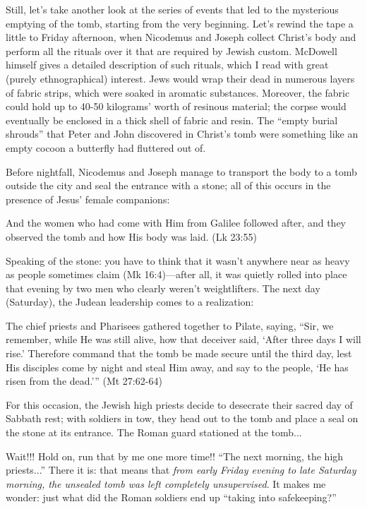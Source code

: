 Still, let's take another look at the series of events that led to the mysterious emptying of the tomb, starting from the very beginning. Let's rewind the tape a little to Friday afternoon, when Nicodemus and Joseph collect Christ's body and perform all the rituals over it that are required by Jewish custom. McDowell himself gives a detailed description of such rituals, which I read with great (purely ethnographical) interest. Jews would wrap their dead in numerous layers of fabric strips, which were soaked in aromatic substances. Moreover, the fabric could hold up to 40-50 kilograms' worth of resinous material; the corpse would eventually be enclosed in a thick shell of fabric and resin. The ``empty burial shrouds'' that Peter and John discovered in Christ's tomb were something like an empty cocoon a butterfly had fluttered out of.

Before nightfall, Nicodemus and Joseph manage to transport the body to a tomb outside the city and seal the entrance with a stone; all of this occurs in the presence of Jesus' female companions:

\begin{smallquote}
    And the women who had come with Him from Galilee followed after, and they observed the tomb and how His body was laid. (Lk 23:55)
\end{smallquote}
Speaking of the stone: you have to think that it wasn't anywhere near as heavy as people sometimes claim (Mk 16:4)---after all, it was quietly rolled into place that evening by two men who clearly weren't weightlifters. The next day (Saturday), the Judean leadership comes to a realization:

\begin{smallquote}
    The chief priests and Pharisees gathered together to Pilate, saying, ``Sir, we remember, while He was still alive, how that deceiver said, `After three days I will rise.' Therefore command that the tomb be made secure until the third day, lest His disciples come by night and steal Him away, and say to the people, `He has risen from the dead.''' (Mt 27:62-64)
\end{smallquote}
For this occasion, the Jewish high priests decide to desecrate their sacred day of
Sabbath rest; with soldiers in tow, they head out to the tomb and place a seal on the
stone at its entrance. The Roman guard stationed at the tomb...

Wait!!! Hold on, run that by me one more time!! ``The next morning, the high priests...'' There it is: that means that \emph{from early Friday evening to late Saturday morning, the unsealed tomb was left completely unsupervised}. It makes me wonder: just what did the Roman soldiers end up ``taking into safekeeping?''